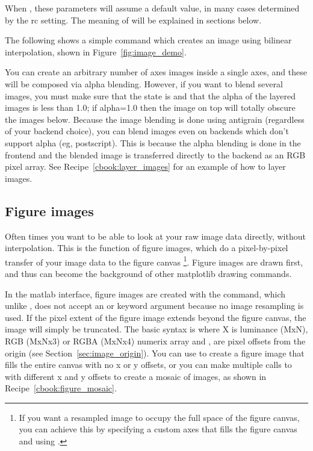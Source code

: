 \documentclass[twoside]{book}
\begin{document}
When , these parameters will assume a default value, in
many cases determined by the rc setting.  The meaning of  will be explained in sections below.

The following shows a simple command which creates an image using
bilinear interpolation, shown in Figure~\ref{fig:image_demo}.




You can create an arbitrary number of axes images inside a single
axes, and these will be composed via alpha blending.  However, if you
want to blend several images, you must make sure that the
 state is  and that the alpha of the
layered images is less than 1.0; if alpha=1.0 then the image on top
will totally obscure the images below.  Because the image blending is
done using antigrain (regardless of your backend choice), you can
blend images even on backends which don't support alpha (eg,
postscript).  This is because the alpha blending is done in the
frontend and the blended image is transferred directly to the backend
as an RGB pixel array.  See Recipe~\ref{cbook:layer_images} for an example of
how to layer images.


\subsection{Figure images}
\label{sec:image_figure}
Often times you want to be able to look at your raw image data
directly, without interpolation.  This is the function of figure
images, which do a pixel-by-pixel transfer of your image data to the
figure canvas \footnote{If you want a resampled image to occupy the
  full space of the figure canvas, you can achieve this by specifying
  a custom axes that fills the figure canvas  and using .}.  Figure images are drawn first,
and thus can become the background of other matplotlib drawing
commands.

In the matlab interface, figure images are created with the
 command, which unlike , does not
accept an  or  keyword argument
because no image resampling is used.  If the pixel extent of the
figure image extends beyond the figure canvas, the image will simply
be truncated.  The basic syntax is 
where X is luminance (MxN), RGB (MxNx3) or RGBA (MxNx4) numerix array
and ,  are pixel offsets from the origin (see
Section~\ref{sec:image_origin}).  You can use  to create a
figure image that fills the entire canvas with no x or y offsets, or
you can make multiple calls to  with different x and
y offsets to create a mosaic of images, as shown in
Recipe~\ref{cbook:figure_mosaic}.
\end{document}
